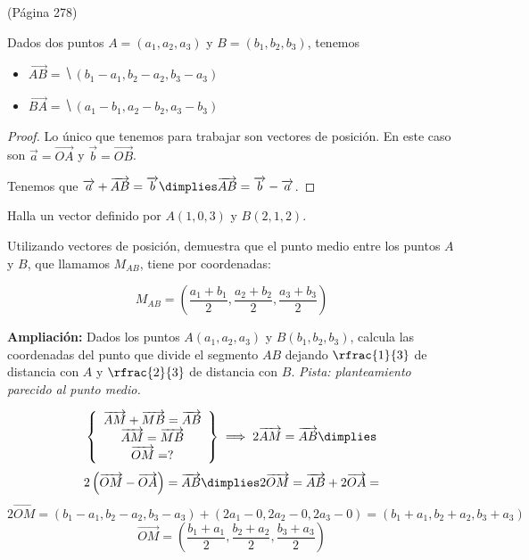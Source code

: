 \begin{defn}
(Página 278)

Dados dos puntos $A=(a_1,a_2,a_3)$ y $B = (b_1,b_2,b_3)$, tenemos 
    \begin{itemize}
        \item $\vec{AB} = \hide{(b_1-a_1, b_2-a_2, b_3-a_3)}$
        \item $\vec{BA} = \hide{(a_1-b_1, a_2-b_2, a_3-b_3)}$ 
    \end{itemize}
\end{defn}

\begin{proof}
Lo único que tenemos para trabajar son vectores de posición. 
%
En este caso son $\vec{a} = \vec{OA}$ y $\vec{b} = \vec{OB}$. 

Tenemos que $\vec{a} + \vec{AB} = \vec{b} \dimplies \vec{AB} = \vec{b}-\vec{a}$.
\end{proof}

\begin{example}
    Halla un vector definido por $A(1,0,3)$ y $B(2,1,2)$.
    
    \hide{\[\vec{AB} = (2-1, 1-0, 2-3) = (1,1,-1)\]}
\end{example}

\begin{problem}

Utilizando vectores de posición, demuestra que el punto medio entre los puntos $A$ y $B$, que llamamos $M_{AB}$, tiene por coordenadas:

\[M_{AB} = \left(\frac{a_1+b_1}{2},\frac{a_2+b_2}{2},\frac{a_3+b_3}{2}\right)\]

\ppart \textbf{Ampliación:} Dados los puntos $A(a_1,a_2,a_3)$ y $B(b_1,b_2,b_3)$, calcula las coordenadas del punto que divide el segmento $AB$ dejando $\rfrac{1}{3}$ de distancia con $A$ y $\rfrac{2}{3}$ de distancia con $B$. \textit{Pista: planteamiento parecido al punto medio.}

\solution

\[
\left\{
\begin{array}{c}
    \vec{AM} + \vec{MB} = \vec{AB}\\
    \vec{AM} = \vec{MB}\\
    \vec{OM} = ?
\end{array}\right\}
 \implies 
  2\vec{AM} = \vec{AB} \dimplies
  \]\[ 
  2\left(\vec{OM} - \vec{OA}\right) = \vec{AB} \dimplies
  2\vec{OM} = \vec{AB} + 2\vec{OA} = 
  \]\[
  2\vec{OM} = \left(
  b_1-a_1,
  b_2-a_2,
  b_3-a_3
  \right) + 
  \left(
  2a_1 - 0,
  2a_2 - 0,
  2a_3 - 0
  \right) = 
  \left(
  b_1+a_1,
  b_2+a_2,
  b_3+a_3
  \right)\]\[
  \vec{OM} = \left(
  \frac{b_1+a_1}{2},
  \frac{b_2+a_2}{2},
  \frac{b_3+a_3}{2}
  \right)
\]

\end{problem}

